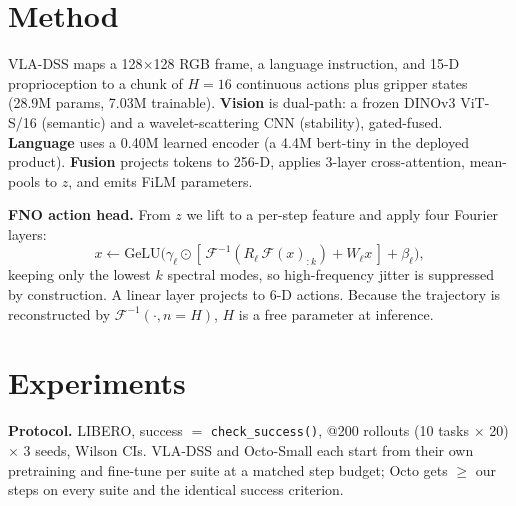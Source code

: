 \documentclass[conference]{IEEEtran}
\begin{document}
\section{Method}\label{sec:method}
VLA-DSS maps a 128$\times$128 RGB frame, a language instruction, and 15-D proprioception
to a chunk of $H{=}16$ continuous actions plus gripper states (28.9M params, 7.03M
trainable). \textbf{Vision} is dual-path: a frozen DINOv3 ViT-S/16 (semantic) and a
wavelet-scattering CNN (stability), gated-fused. \textbf{Language} uses a 0.40M learned
encoder (a 4.4M bert-tiny in the deployed product). \textbf{Fusion} projects tokens to
256-D, applies 3-layer cross-attention, mean-pools to $z$, and emits FiLM parameters.

\noindent\textbf{FNO action head.} From $z$ we lift to a per-step feature and apply
four Fourier layers:
\begin{equation}
x \leftarrow \mathrm{GeLU}\!\big(\gamma_\ell \odot [\,\mathcal{F}^{-1}(R_\ell \,\mathcal{F}(x)_{:k}) + W_\ell x\,] + \beta_\ell\big),
\end{equation}
keeping only the lowest $k$ spectral modes, so high-frequency jitter is suppressed by
construction. A linear layer projects to 6-D actions. Because the trajectory is
reconstructed by $\mathcal{F}^{-1}(\cdot, n{=}H)$, $H$ is a free parameter at inference.

\section{Experiments}
\textbf{Protocol.} LIBERO, success $=$ \texttt{check\_success()}, @200 rollouts
(10 tasks $\times$ 20) $\times$ 3 seeds, Wilson CIs. VLA-DSS and Octo-Small each start
from their own pretraining and fine-tune per suite at a matched step budget; Octo gets
$\ge$ our steps on every suite and the identical success criterion.
\end{document}
